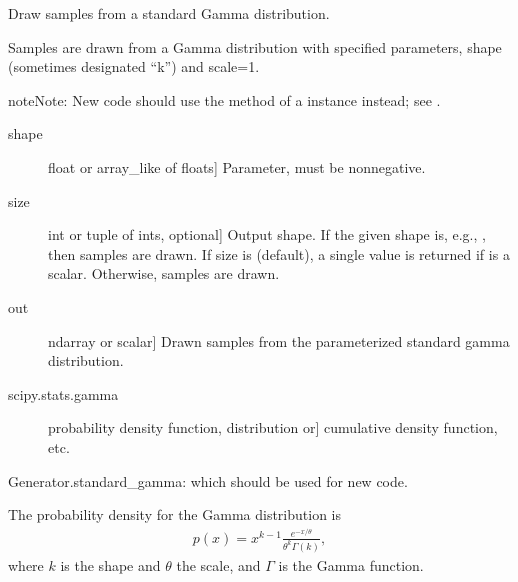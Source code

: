 \documentclass[letterpaper,10pt,english]{sphinxmanual}
\begin{document}
\begin{fulllineitems}
\label{\detokenize{infrapy.utils:infrapy.utils.ref2sac.standard_gamma}}
Draw samples from a standard Gamma distribution.

Samples are drawn from a Gamma distribution with specified parameters,
shape (sometimes designated “k”) and scale=1.

\begin{sphinxadmonition}{note}{Note:}
New code should use the  method of a 
instance instead; see .
\end{sphinxadmonition}
\begin{description}
\item[{shape}] \leavevmode{[}float or array\_like of floats{]}
Parameter, must be non\sphinxhyphen{}negative.

\item[{size}] \leavevmode{[}int or tuple of ints, optional{]}
Output shape.  If the given shape is, e.g., , then
 samples are drawn.  If size is  (default),
a single value is returned if  is a scalar.  Otherwise,
 samples are drawn.

\end{description}
\begin{description}
\item[{out}] \leavevmode{[}ndarray or scalar{]}
Drawn samples from the parameterized standard gamma distribution.

\end{description}
\begin{description}
\item[{scipy.stats.gamma}] \leavevmode{[}probability density function, distribution or{]}
cumulative density function, etc.

\end{description}

Generator.standard\_gamma: which should be used for new code.

The probability density for the Gamma distribution is
\begin{equation*}
\begin{split}p(x) = x^{k-1}\frac{e^{-x/\theta}}{\theta^k\Gamma(k)},\end{split}
\end{equation*}
where \(k\) is the shape and \(\theta\) the scale,
and \(\Gamma\) is the Gamma function.


\end{fulllineitems}
\end{document}
